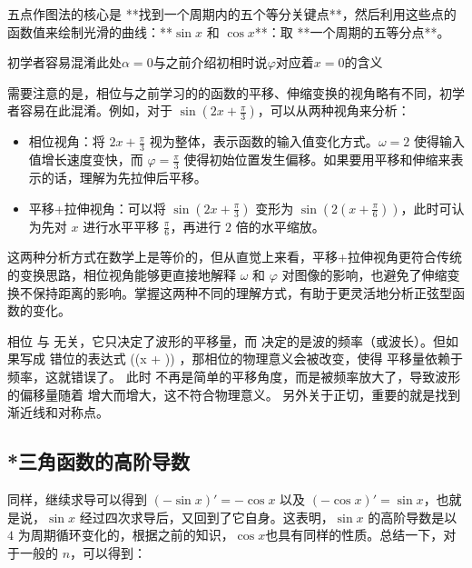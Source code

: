 五点作图法的核心是 **找到一个周期内的五个等分关键点**，然后利用这些点的函数值来绘制光滑的曲线：**$\sin x$ 和 $\cos x$**：取 **一个周期的五等分点**。

初学者容易混淆此处$\alpha=0$与之前介绍初相时说$\varphi$对应着$x=0$的含义


需要注意的是，相位与之前学习的的函数的平移、伸缩变换的视角略有不同，初学者容易在此混淆。例如，对于 $\displaystyle\sin(2x + \frac{\pi}{3})$，可以从两种视角来分析：
\begin{itemize}
\item 相位视角：将 $\displaystyle2x + \frac{\pi}{3}$ 视为整体，表示函数的输入值变化方式。$\omega = 2$ 使得输入值增长速度变快，而 $\displaystyle\varphi = \frac{\pi}{3}$ 使得初始位置发生偏移。如果要用平移和伸缩来表示的话，理解为先拉伸后平移。
\item 平移+拉伸视角：可以将 $\displaystyle\sin(2x + \frac{\pi}{3})$ 变形为 $\displaystyle\sin\left(2(x + \frac{\pi}{6})\right)$，此时可认为先对 $x$ 进行水平平移 $\displaystyle\frac{\pi}{6}$，再进行 $2$ 倍的水平缩放。
\end{itemize}

这两种分析方式在数学上是等价的，但从直觉上来看，平移+拉伸视角更符合传统的变换思路，相位视角能够更直接地解释 $\omega$ 和 $\varphi$ 对图像的影响，也避免了伸缩变换不保持距离的影响。掌握这两种不同的理解方式，有助于更灵活地分析正弦型函数的变化。

相位  \phi  与  \omega  无关，它只决定了波形的平移量，而  \omega  决定的是波的频率（或波长）。但如果写成 错位的表达式  \sin(\omega(x + \phi)) ，那相位的物理意义会被改变，使得 平移量依赖于频率，这就错误了。
此时  \phi  不再是简单的平移角度，而是被频率放大了，导致波形的偏移量随着  \omega  增大而增大，这不符合物理意义。
另外关于正切，重要的就是找到渐近线和对称点。



\subsection{*三角函数的高阶导数}

同样，继续求导可以得到 $(-\sin x)' = -\cos x$ 以及 $(-\cos x)' = \sin x$，也就是说，$\sin x$ 经过四次求导后，又回到了它自身。这表明，$\sin x$ 的高阶导数是以 $4$ 为周期循环变化的，根据之前的知识，$\cos x$也具有同样的性质。总结一下，对于一般的 $n$，可以得到：


